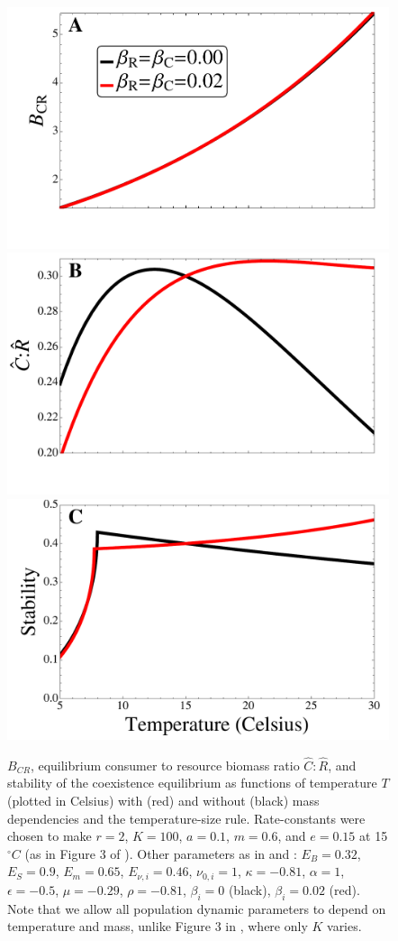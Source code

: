 \documentclass[11pt]{article}
\begin{document}
\begin{figure}[!ht]
\centering
\includegraphics[width=0.5\linewidth]{BCRAllTempMassDep}\\\vspace{-0.75cm}
\includegraphics[width=0.5\linewidth]{CtoRAllTempMassDep}\\\vspace{-0.75cm}
\includegraphics[width=0.5\linewidth]{StabilityAllTempMassDep}
\caption{
$B_{CR}$, equilibrium consumer to resource biomass ratio $\hat{C}:\hat{R}$, and stability of the coexistence equilibrium as functions of temperature $T$ (plotted in Celsius) with (red) and without (black) mass dependencies and the temperature-size rule.
Rate-constants were chosen to make $r = 2$, $K = 100$, $a = 0.1$, $m = 0.6$, and $e = 0.15$ at 15$^\circ C$ (as in Figure 3 of \cite{Gilbert2014}).
Other parameters as in \cite{Gilbert2014} and \cite{DeLong2015}: $E_B = 0.32$, $E_S = 0.9$, $E_m = 0.65$, $E_{\nu,i} = 0.46$, $\nu_{0,i} = 1$, $\kappa = -0.81$, $\alpha = 1$, $\epsilon = -0.5$, $\mu = -0.29$, $\rho = -0.81$, $\beta_i = 0$ (black), $\beta_i = 0.02$ (red).  
Note that we allow all population dynamic parameters to depend on temperature and mass, unlike Figure 3 in \cite{Gilbert2014}, where only $K$ varies.
}
\label{AllTempMassDep}
\end{figure}
\end{document}
